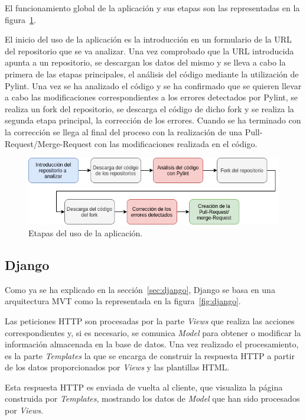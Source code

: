 \documentclass[a4paper, 12pt]{book}
\begin{document}
El funcionamiento global de la aplicación y sus etapas son las representadas en la figura~\ref{fig:uso}.

El inicio del uso de la aplicación es la introducción en un formulario de la URL del repositorio que se va analizar. Una vez comprobado que la URL introducida apunta a un repositorio, se descargan los datos del mismo y se lleva a cabo la primera de las etapas principales, el análisis del código mediante la utilización de Pylint.
Una vez se ha analizado el código y se ha confirmado que se quieren llevar a cabo las modificaciones correspondientes a los errores detectados por Pylint, se realiza un fork del repositorio, se descarga el código de dicho fork y se realiza la segunda etapa principal, la corrección de los errores.
Cuando se ha terminado con la corrección se llega al final del proceso con la realización de una Pull-Request/Merge-Request con las modificaciones realizada en el código.

\begin{figure}[h]
  \centering
  \includegraphics[width=12cm, keepaspectratio]{img/uso.png}
  \caption{Etapas del uso de la aplicación.}\label{fig:uso}
\end{figure}

\subsection{Django}
\label{subsec:diseño_django}

Como ya se ha explicado en la sección~\ref{sec:django}, Django se basa en una arquitectura MVT como la representada en la figura~\ref{fig:django}.

Las peticiones HTTP son procesadas por la parte \textit{Views} que realiza las acciones correspondientes y, si es necesario, se comunica \textit{Model} para obtener o modificar la información almacenada en la base de datos.
Una vez realizado el procesamiento, es la parte \textit{Templates} la que se encarga de construir la respuesta HTTP a partir de los datos proporcionados por \textit{Views} y las plantillas HTML.

Esta respuesta HTTP es enviada de vuelta al cliente, que visualiza la página construida por \textit{Templates}, mostrando los datos de \textit{Model} que han sido procesados por \textit{Views}.
\end{document}
